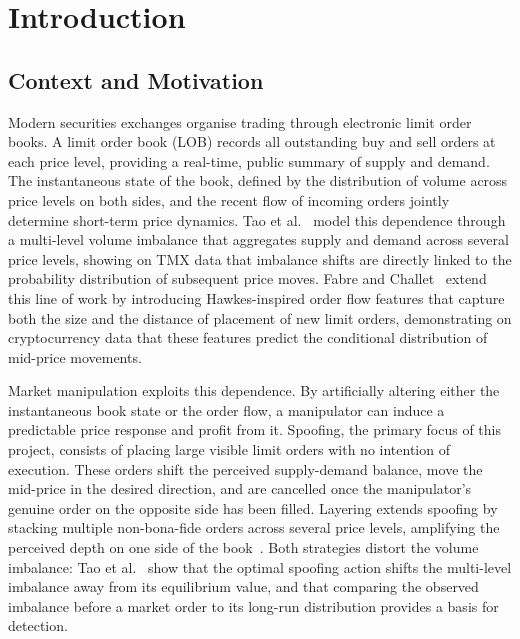 \documentclass[11pt]{report}
\begin{document}
\newpage
\tableofcontents


\chapter{Introduction}\label{chap:intro}

\section{Context and Motivation}\label{sec:intro:context}

Modern securities exchanges organise trading through electronic limit order books. A limit order book (LOB) records all outstanding buy and sell orders at each price level, providing a real-time, public summary of supply and demand. The instantaneous state of the book, defined by the distribution of volume across price levels on both sides, and the recent flow of incoming orders jointly determine short-term price dynamics. Tao et al.~\cite{tao_2020} model this dependence through a multi-level volume imbalance that aggregates supply and demand across several price levels, showing on TMX data that imbalance shifts are directly linked to the probability distribution of subsequent price moves. Fabre and Challet~\cite{fabre_2025} extend this line of work by introducing Hawkes-inspired order flow features that capture both the size and the distance of placement of new limit orders, demonstrating on cryptocurrency data that these features predict the conditional distribution of mid-price movements.

Market manipulation exploits this dependence. By artificially altering either the instantaneous book state or the order flow, a manipulator can induce a predictable price response and profit from it. Spoofing, the primary focus of this project, consists of placing large visible limit orders with no intention of execution. These orders shift the perceived supply-demand balance, move the mid-price in the desired direction, and are cancelled once the manipulator's genuine order on the opposite side has been filled. Layering extends spoofing by stacking multiple non-bona-fide orders across several price levels, amplifying the perceived depth on one side of the book~\cite{fabre_2025}. Both strategies distort the volume imbalance: Tao et al.~\cite{tao_2020} show that the optimal spoofing action shifts the multi-level imbalance away from its equilibrium value, and that comparing the observed imbalance before a market order to its long-run distribution provides a basis for detection.
\end{document}
